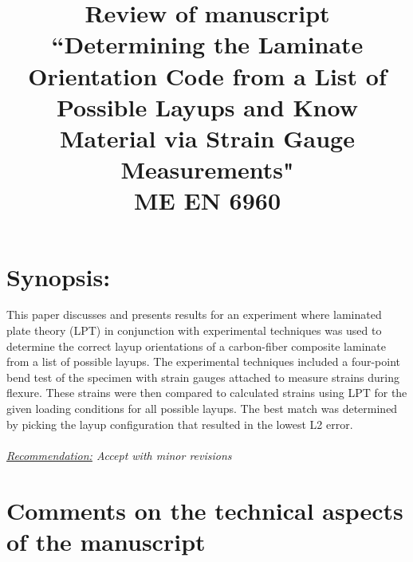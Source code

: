 \documentclass[12pt]{article}
\begin{document}
\title{ Review of manuscript ``Determining the Laminate Orientation Code from a List of Possible Layups and Know Material via Strain Gauge Measurements" \\ \normalsize{ME EN 6960}}
\maketitle


\section{Synopsis:} 
This paper discusses and presents results for an experiment where laminated plate theory (LPT) in conjunction with experimental techniques was used to determine the correct layup orientations of a carbon-fiber composite laminate from a list of possible layups. The experimental techniques included a four-point bend test of the specimen with strain gauges attached to measure strains during flexure. These strains were then compared to calculated strains using LPT for the given loading conditions for all possible layups. The best match was determined by picking the layup configuration that resulted in the lowest L2 error.
\\ 
\\
\textit{\underline{Recommendation:} Accept with minor revisions}

\section{Comments on the technical aspects of the manuscript}
 
\end{document}
